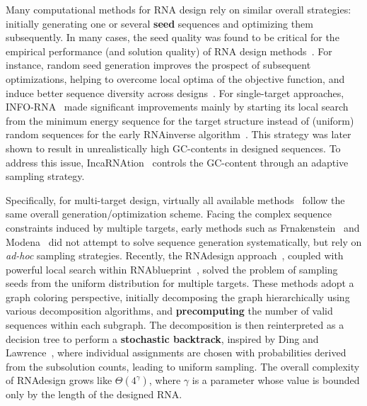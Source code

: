 \documentclass{bioinfo}
\newcommand{\Def}[1]{{\bf #1}}
\newcommand{\parHead}[1]{\Final{\paragraph{#1}}}
\newcommand{\Final}[1]{#1}
\renewcommand{\Final}[1]{}
\newcommand{\Nuc}[1]{{\sf #1}}
\newcommand{\Cb}{\Nuc{C}}
\newcommand{\Gb}{\Nuc{G}}
\newcommand{\Software}[1]{{\ttfamily #1}}
\begin{document}
\parHead{On the importance of sampling for design.}
Many computational methods for RNA design rely on similar overall
strategies: initially generating one or several \Def{seed} sequences
and optimizing them subsequently. In many cases, the seed quality was
found to be critical for the empirical performance (and solution
quality) of RNA design methods~\cite{Levin2012}. For instance, random
seed generation improves the prospect of subsequent optimizations, helping
to overcome local optima of the objective function, and induce better
sequence diversity across designs~\cite{Reinharz2013}.  For
single-target approaches, \Software{INFO-RNA}~\cite{Busch2006} made
significant improvements mainly by starting its local search from the
minimum energy sequence for the target structure instead of (uniform)
random sequences for the early \Software{RNAinverse}
algorithm~\cite{Hofacker1994}. This strategy was later shown to result
in unrealistically high \Gb\Cb-contents in designed sequences. To
address this issue, \Software{IncaRNAtion}~\cite{Reinharz2013}
controls the \Gb\Cb-content through an adaptive sampling strategy.

\parHead{Specificities and similarities of multi-target design.}
Specifically, for multi-target design, virtually all available methods~\cite{Lyngsoe2012,HoenerzuSiederdissen2013,Taneda2015,Hammer2017} follow the same overall generation/optimization scheme.
%
Facing the complex sequence constraints induced by multiple targets, early methods such as \Software{Frnakenstein}~\cite{Lyngsoe2012} and \Software{Modena}~\cite{Taneda2015} did not attempt to solve sequence generation systematically, but rely on \emph{ad-hoc} sampling strategies. 
%
Recently, the \Software{RNAdesign} approach~\cite{HoenerzuSiederdissen2013}, coupled with powerful local search within \Software{RNAblueprint}~\cite{Hammer2017}, solved the problem of sampling seeds from the uniform distribution for multiple targets. These methods adopt a graph coloring perspective, initially decomposing the graph hierarchically using various decomposition algorithms, and \Def{precomputing} the number of valid sequences within each subgraph. The decomposition is then reinterpreted as a decision tree to perform a \Def{stochastic backtrack}, inspired by Ding and Lawrence~\cite{Ding2003}, where individual assignments are chosen with probabilities derived from the subsolution counts, leading to uniform sampling. The overall complexity of \Software{RNAdesign} grows like $\Theta(4^{\gamma})$, where $\gamma$ is a parameter whose value is bounded only by the length of the designed RNA. 
\end{document}
